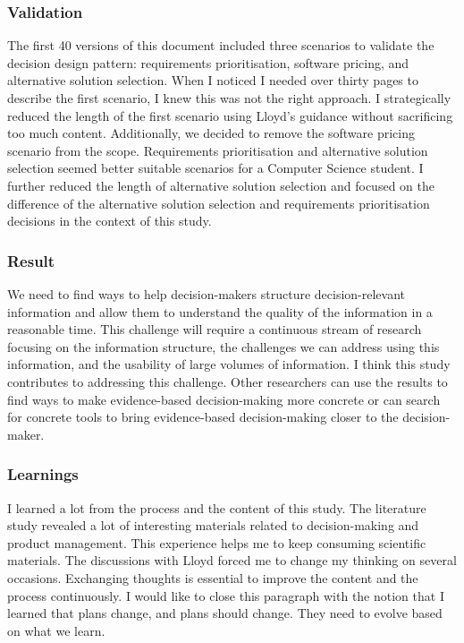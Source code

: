 \subsubsection{Validation}
The first 40 versions of this document included three scenarios to validate the decision design pattern: requirements prioritisation, software pricing, and alternative solution selection. When I noticed I needed over thirty pages to describe the first scenario, I knew this was not the right approach. I strategically reduced the length of the first scenario using Lloyd's guidance without sacrificing too much content. Additionally, we decided to remove the software pricing scenario from the scope. Requirements prioritisation and alternative solution selection seemed better suitable scenarios for a Computer Science student. I further reduced the length of alternative solution selection and focused on the difference of the alternative solution selection and requirements prioritisation decisions in the context of this study.

\subsubsection{Result}
We need to find ways to help decision-makers structure decision-relevant information and allow them to understand the quality of the information in a reasonable time. This challenge will require a continuous stream of research focusing on the information structure, the challenges we can address using this information, and the usability of large volumes of information. I think this study contributes to addressing this challenge. Other researchers can use the results to find ways to make evidence-based decision-making more concrete or can search for concrete tools to bring evidence-based decision-making closer to the decision-maker.

\subsubsection{Learnings}
I learned a lot from the process and the content of this study. The literature study revealed a lot of interesting materials related to decision-making and product management. This experience helps me to keep consuming scientific materials. The discussions with Lloyd forced me to change my thinking on several occasions. Exchanging thoughts is essential to improve the content and the process continuously. I would like to close this paragraph with the notion that I learned that plans change, and plans should change. They need to evolve based on what we learn.